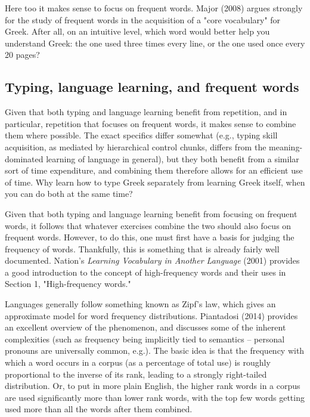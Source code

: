 \documentclass[11pt]{article}
\begin{document}
Here too it makes sense to focus on frequent words. Major (2008) argues strongly for the study of frequent words in the acquisition of a "core vocabulary" for Greek. After all, on an intuitive level, which word would better help you understand Greek: the one used three times every line, or the one used once every 20 pages?

\subsection{Typing, language learning, and frequent words}
\label{sec:org2a13ef6}

Given that both typing and language learning benefit from repetition, and in particular, repetition that focuses on frequent words, it makes sense to combine them where possible. The exact specifics differ somewhat (e.g., typing skill acquisition, as mediated by hierarchical control chunks, differs from the meaning-dominated learning of language in general), but they both benefit from a similar sort of time expenditure, and combining them therefore allows for an efficient use of time. Why learn how to type Greek separately from learning Greek itself, when you can do both at the same time?

Given that both typing and language learning benefit from focusing on frequent words, it follows that whatever exercises combine the two should also focus on frequent words. However, to do this, one must first have a basis for judging the frequency of words. Thankfully, this is something that is already fairly well documented. Nation's \emph{Learning Vocabulary in Another Language} (2001) provides a good introduction to the concept of high-frequency words and their uses in Section 1, "High-frequency words." 

Languages generally follow something known as Zipf's law, which gives an approximate model for word frequency distributions. Piantadosi (2014) provides an excellent overview of the phenomenon, and discusses some of the inherent complexities (such as frequency being implicitly tied to semantics -- personal pronouns are universally common, e.g.). The basic idea is that the frequency with which a word occurs in a corpus (as a percentage of total use) is roughly proportional to the inverse of its rank, leading to a strongly right-tailed distribution. Or, to put in more plain English, the higher rank words in a corpus are used significantly more than lower rank words, with the top few words getting used more than all the words after them combined.
\end{document}

